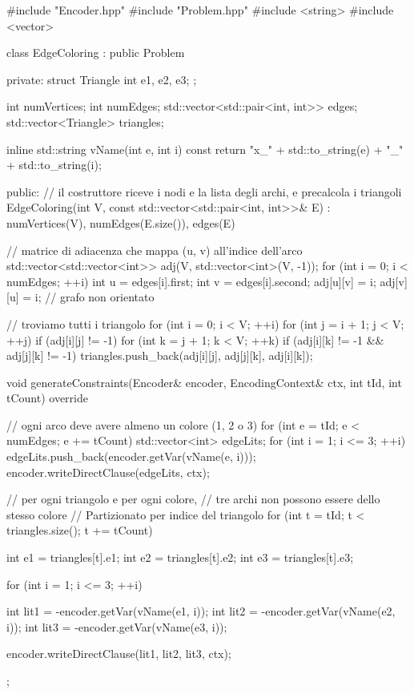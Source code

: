 \documentclass[10pt]{article}
\begin{document}
\begin{cppbox}{}
#include "Encoder.hpp"
#include "Problem.hpp"
#include <string>
#include <vector>

class EdgeColoring : public Problem {
private:
    struct Triangle {
        int e1, e2, e3;
    };

    int numVertices;
    int numEdges;
    std::vector<std::pair<int, int>> edges;
    std::vector<Triangle> triangles;

    inline std::string vName(int e, int i) const {
        return "x_" + std::to_string(e) + "_" + std::to_string(i);
    }

public:
    // il costruttore riceve i nodi e la lista degli archi, e precalcola i triangoli
    EdgeColoring(int V, const std::vector<std::pair<int, int>>& E) 
        : numVertices(V), numEdges(E.size()), edges(E) {
        
        // matrice di adiacenza che mappa (u, v) all'indice dell'arco
        std::vector<std::vector<int>> adj(V, std::vector<int>(V, -1));
        for (int i = 0; i < numEdges; ++i) {
            int u = edges[i].first;
            int v = edges[i].second;
            adj[u][v] = i;
            adj[v][u] = i; // grafo non orientato
        }

        // troviamo tutti i triangolo
        for (int i = 0; i < V; ++i) {
            for (int j = i + 1; j < V; ++j) {
                if (adj[i][j] != -1) {
                    for (int k = j + 1; k < V; ++k) {
                        if (adj[i][k] != -1 && adj[j][k] != -1) {
                            triangles.push_back({adj[i][j], adj[j][k], adj[i][k]});
                        }
                    }
                }
            }
        }
    }

    void generateConstraints(Encoder& encoder, EncodingContext& ctx, 
                             int tId, int tCount) override {
        
        // ogni arco deve avere almeno un colore (1, 2 o 3)
        for (int e = tId; e < numEdges; e += tCount) {
            std::vector<int> edgeLits;
            for (int i = 1; i <= 3; ++i) {
                edgeLits.push_back(encoder.getVar(vName(e, i)));
            }
            encoder.writeDirectClause(edgeLits, ctx);
        }

        // per ogni triangolo e per ogni colore, 
        // tre archi non possono essere dello stesso colore
        // Partizionato per indice del triangolo
        for (int t = tId; t < triangles.size(); t += tCount) {
            int e1 = triangles[t].e1;
            int e2 = triangles[t].e2;
            int e3 = triangles[t].e3;

            for (int i = 1; i <= 3; ++i) {
                int lit1 = -encoder.getVar(vName(e1, i));
                int lit2 = -encoder.getVar(vName(e2, i));
                int lit3 = -encoder.getVar(vName(e3, i));
                
                encoder.writeDirectClause({lit1, lit2, lit3}, ctx);
            }
        }
    }
};
\end{cppbox}
\end{document}
